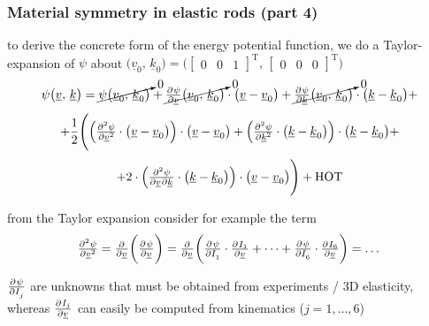 \begin{frame}
  \frametitle{Material symmetry in elastic rods (part 4)}

  to derive the concrete form of the energy potential function, \newline
  we do a Taylor-expansion of $\psi$ about $\bigl( \underline{v}_0 , \, \underline{k}_0 \bigr) = \bigl( \begin{bmatrix}
    0 & 0 & 1
  \end{bmatrix}^{\mathrm{T}} , \, \begin{bmatrix}
    0 & 0 & 0
  \end{bmatrix}^{\mathrm{T}} \bigr)$
  \begin{displaymath}
    \psi \bigl( \underline{v}, \, \underline{k} \bigr) =
    \cancelto{0}{ \psi \bigl( \underline{v}_0, \, \underline{k}_0 \bigr) } +
    \cancelto{0}{ \pd{\psi}{\underline{v}} \bigl( \underline{v}_0, \, \underline{k}_0 \bigr) } \cdot \bigl( \underline{v} - \underline{v}_0 \bigr)  +
    \cancelto{0}{ \pd{\psi}{\underline{k}} \bigl( \underline{v}_0, \, \underline{k}_0 \bigr) } \cdot \bigl( \underline{k} - \underline{k}_0 \bigr) +
  \end{displaymath}
  \begin{displaymath}
    + \frac{1}{2} \Biggl(
      \Bigl( \pd[2]{\psi}{\underline{v}} \cdot \bigl( \underline{v} - \underline{v}_0 \bigr) \Bigr) \cdot \bigl( \underline{v} - \underline{v}_0 \bigr) + 
      \Bigl( \pd[2]{\psi}{\underline{k}} \cdot \bigl( \underline{k} - \underline{k}_0 \bigr) \Bigr) \cdot \bigl( \underline{k} - \underline{k}_0 \bigr) +
  \end{displaymath}
  \begin{displaymath}
      + 2 \cdot \Bigl( \md{\psi}{2}{\underline{v}}{}{\underline{k}}{} \cdot \bigl( \underline{k} - \underline{k}_0 \bigr) \Bigr) \cdot \bigl( \underline{v} - \underline{v}_0 \bigr)
    \Biggr) + \text{HOT}
  \end{displaymath}
  
  \vspace{0.5em}
  from the Taylor expansion consider for example the term
  \begin{displaymath}
    \pd[2]{\psi}{\underline{v}} =
    \pd{}{\underline{v}} \biggl( \pd{\psi}{\underline{v}} \biggr) =
    \pd{}{\underline{v}} \biggl( \pd{\psi}{I_1} \cdot \pd{I_1}{\underline{v}} + \dots + \pd{\psi}{I_6} \cdot \pd{I_6}{\underline{v}} \biggr) = \dots
  \end{displaymath}
  
  $\pd{\psi}{I_j}$ are unknowns that must be obtained from experiments / 3D elasticity,
  whereas $\pd{I_j}{\underline{v}}$ can easily be computed from kinematics ($j = 1,\dots,6$)

\end{frame}


